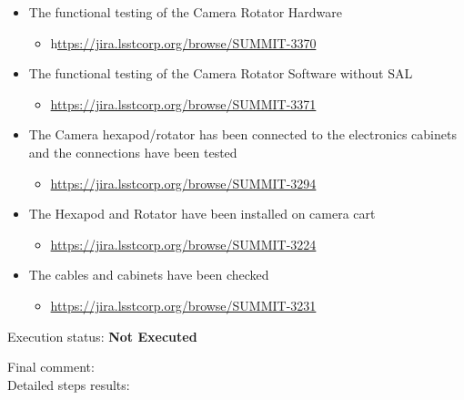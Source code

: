 \documentclass[SE,lsstdraft,STR,toc]{lsstdoc}
\providecommand{\tightlist}{
  \setlength{\itemsep}{0pt}\setlength{\parskip}{0pt}}
\begin{document}
\begin{itemize}
\tightlist
\item
  The functional testing of the Camera Rotator Hardware~

  \begin{itemize}
  \tightlist
  \item
    h\href{https://jira.lsstcorp.org/browse/SUMMIT-3370}{ttps://jira.lsstcorp.org/browse/SUMMIT-3370}
  \end{itemize}
\item
  The functional testing of the Camera Rotator Software without SAL

  \begin{itemize}
  \tightlist
  \item
    \url{https://jira.lsstcorp.org/browse/SUMMIT-3371}
  \end{itemize}
\item
  The Camera hexapod/rotator has been connected to the electronics
  cabinets and the connections have been tested

  \begin{itemize}
  \tightlist
  \item
    \url{https://jira.lsstcorp.org/browse/SUMMIT-3294}
  \end{itemize}
\item
  The Hexapod and Rotator have been installed on camera cart

  \begin{itemize}
  \tightlist
  \item
    \url{https://jira.lsstcorp.org/browse/SUMMIT-3224}
  \end{itemize}
\item
  The cables and cabinets have been checked

  \begin{itemize}
  \tightlist
  \item
    \url{https://jira.lsstcorp.org/browse/SUMMIT-3231}
  \end{itemize}
\end{itemize}


Execution status: {\bf Not Executed }

Final comment:\\


Detailed steps results:
\end{document}
